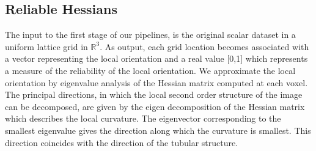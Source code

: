 \subsection {Reliable Hessians}
\label{subsec:rh}

The input to the first stage of our pipelines, is the original scalar dataset in a uniform lattice grid in $\mathbb{R}^3$. As output, each grid location becomes associated with a vector representing the local orientation and a real value [0,1] which represents a measure of the reliability of the local orientation. We approximate the local orientation by eigenvalue analysis of the Hessian matrix computed at each voxel. The principal directions, in which the local second order structure of the image can be decomposed, are given by the eigen decomposition of the Hessian matrix which describes the local curvature.
The eigenvector corresponding to the smallest eigenvalue gives the direction along which the curvature is smallest. This direction coincides with the direction of the tubular structure.

